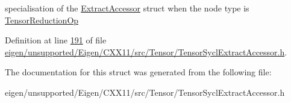 specialisation of the \hyperlink{struct_eigen_1_1_tensor_sycl_1_1internal_1_1_extract_accessor}{Extract\+Accessor} struct when the node type is \hyperlink{class_eigen_1_1_tensor_reduction_op}{Tensor\+Reduction\+Op} 

Definition at line \hyperlink{eigen_2unsupported_2_eigen_2_c_x_x11_2src_2_tensor_2_tensor_sycl_extract_accessor_8h_source_l00191}{191} of file \hyperlink{eigen_2unsupported_2_eigen_2_c_x_x11_2src_2_tensor_2_tensor_sycl_extract_accessor_8h_source}{eigen/unsupported/\+Eigen/\+C\+X\+X11/src/\+Tensor/\+Tensor\+Sycl\+Extract\+Accessor.\+h}.



The documentation for this struct was generated from the following file\+:\begin{DoxyCompactItemize}
\item 
eigen/unsupported/\+Eigen/\+C\+X\+X11/src/\+Tensor/\+Tensor\+Sycl\+Extract\+Accessor.\+h\end{DoxyCompactItemize}
